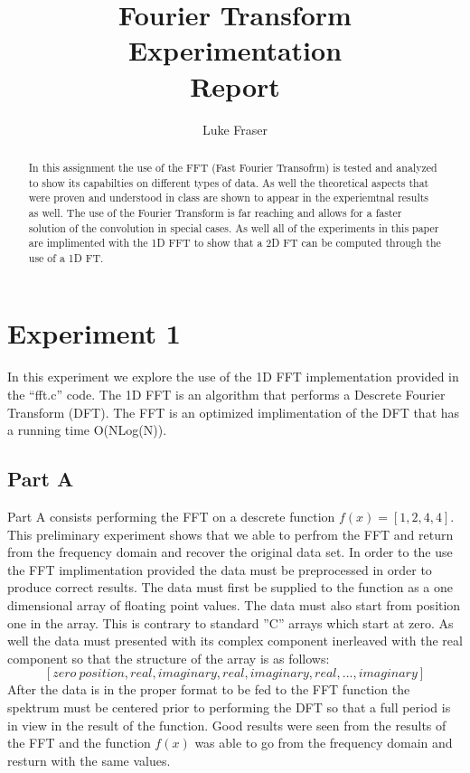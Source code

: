 \documentclass[letter]{article}
\title{Fourier Transform Experimentation \\ Report}
\author{Luke Fraser}
\begin{document}
\maketitle

\begin{abstract}
In this assignment the use of the FFT (Fast Fourier Transofrm) is tested and analyzed to show its capabilties on different types of data. As well the theoretical aspects that were proven and understood in class are shown to appear in the experiemtnal results as well. The use of the Fourier Transform is far reaching and allows for a faster solution of the convolution in special cases. As well all of the experiments in this paper are implimented with the 1D FFT to show that a 2D FT can be computed through the use of a 1D FT.
\end{abstract}

\section{Experiment 1}
In this experiment we explore the use of the 1D FFT implementation provided in the ``fft.c'' code. The 1D FFT is an algorithm that performs a Descrete Fourier Transform (DFT). The FFT is an optimized implimentation of the DFT that has a running time O(NLog(N)).
\subsection{Part A}
Part A consists performing the FFT on a descrete function $f(x) = [1, 2, 4, 4]$. This preliminary experiment shows that we able to perfrom the FFT and return from the frequency domain and recover the original data set. In order to the use the FFT implimentation provided the data must be preprocessed in order to produce correct results. The data must first be supplied to the function as a one dimensional array of floating point values. The data must also start from position one in the array. This is contrary to standard ''C'' arrays which start at zero. As well the data must presented with its complex component inerleaved with the real component so that the structure of the array is as follows: $$[zero~position, real, imaginary, real, imaginary, real, ..., imaginary]$$ After the data is in the proper format to be fed to the FFT function the spektrum must be centered prior to performing the DFT so that a full period is in view in the result of the function. Good results were seen from the results of the FFT and the function $f(x)$ was able to go from the frequency domain and resturn with the same values.
\end{document}
